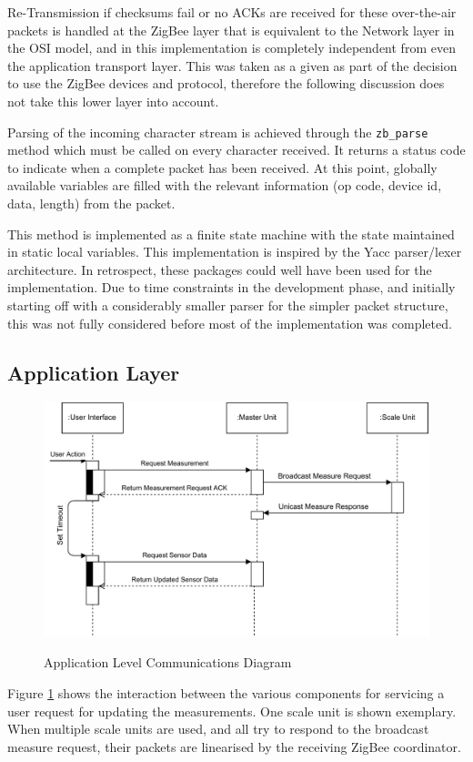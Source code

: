 Re-Transmission if checksums fail or no ACKs are received for these over-the-air packets is handled at the ZigBee layer that is equivalent to the Network layer in the OSI model, and in this implementation is completely independent from even the application transport layer. This was taken as a given as part of the decision to use the ZigBee devices and protocol, therefore the following discussion does not take this lower layer into account.


Parsing of the incoming character stream is achieved through the \texttt{zb\_parse} method which must be called on every character received. It returns a status code to indicate when a complete packet has been received. At this point, globally available variables are filled with the relevant information (op code, device id, data, length) from the packet.

This method is implemented as a finite state machine with the state maintained in static local variables. This implementation is inspired by the Yacc parser/lexer architecture. In retrospect, these packages could well have been used for the implementation. Due to time constraints in the development phase, and initially starting off with a considerably smaller parser for the simpler packet structure, this was not fully considered before most of the implementation was completed. 

\subsection{Application Layer}
\begin{figure}
\includegraphics[width=\textwidth]{images/communications-diagram.pdf}
\label{communications-diagram}
\caption{Application Level Communications Diagram}
\end{figure}
Figure \ref{communications-diagram} shows the interaction between the various components for servicing a user request for updating the measurements. One scale unit is shown exemplary. When multiple scale units are used, and all try to respond to the broadcast measure request, their packets are linearised by the receiving ZigBee coordinator.

